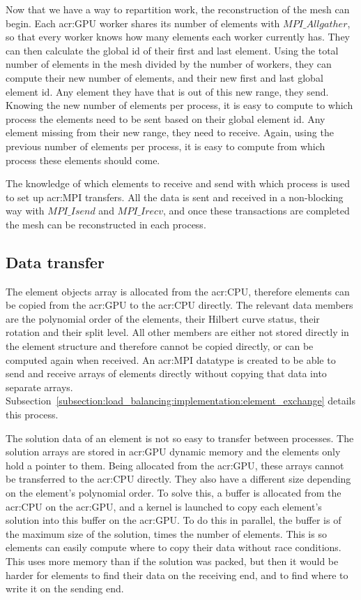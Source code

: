 Now that we have a way to repartition work, the reconstruction of the mesh can begin. Each
\acrshort{acr:GPU} worker shares its number of elements with \(MPI\_Allgather\), so that every worker
knows how many elements each worker currently has. They can then calculate the global id of their
first and last element. Using the total number of elements in the mesh divided by the number of
workers, they can compute their new number of elements, and their new first and last global element
id. Any element they have that is out of this new range, they send. Knowing the new number of
elements per process, it is easy to compute to which process the elements need to be sent based on
their global element id. Any element missing from their new range, they need to receive. Again,
using the previous number of elements per process, it is easy to compute from which process these
elements should come. 

The knowledge of which elements to receive and send with which process is used to set up
\acrshort{acr:MPI} transfers. All the data is sent and received in a non-blocking way with
\(MPI\_Isend\) and \(MPI\_Irecv\), and once these transactions are completed the mesh can be
reconstructed in each process.

\subsection{Data transfer}\label{subsection:load_balancing:reconstruction:data_transfer}

The element objects array is allocated from the \acrshort{acr:CPU}, therefore elements can be copied
from the \acrshort{acr:GPU} to the \acrshort{acr:CPU} directly. The relevant data members are the
polynomial order of the elements, their Hilbert curve status, their rotation and their split level.
All other members are either not stored directly in the element structure and therefore cannot be
copied directly, or can be computed again when received. An \acrshort{acr:MPI} datatype is created
to be able to send and receive arrays of elements directly without copying that data into separate
arrays. Subsection~\ref{subsection:load_balancing:implementation:element_exchange} details this
process.

The solution data of an element is not so easy to transfer between processes. The solution arrays
are stored in \acrshort{acr:GPU} dynamic memory and the elements only hold a pointer to them. Being
allocated from the \acrshort{acr:GPU}, these arrays cannot be transferred to the \acrshort{acr:CPU}
directly. They also have a different size depending on the element's polynomial order. To solve
this, a buffer is allocated from the \acrshort{acr:CPU} on the \acrshort{acr:GPU}, and a kernel is
launched to copy each element's solution into this buffer on the \acrshort{acr:GPU}. To do this in
parallel, the buffer is of the maximum size of the solution, times the number of elements. This is
so elements can easily compute where to copy their data without race conditions. This uses more
memory than if the solution was packed, but then it would be harder for elements to find their data
on the receiving end, and to find where to write it on the sending end. 

